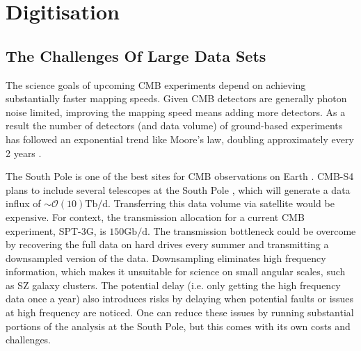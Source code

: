 \documentclass[a4paper,fleqn,usenatbib]{mnras}
\begin{document}






\section{Digitisation}
\label{sec:dig}

\subsection{The Challenges Of Large Data Sets}
\label{subsec:problem}


The science goals of upcoming CMB experiments depend on achieving substantially faster mapping speeds. Given CMB detectors are generally photon noise limited, improving the mapping speed means adding more detectors. As a result the number of detectors (and data volume) of ground-based experiments has followed an exponential trend like Moore's law, doubling approximately every 2 years \citep{s4sciencebook, Abazajian2015}.

The South Pole is one of the best sites for CMB observations on Earth \citep{chamberlin2001, spt2004}. CMB-S4 plans to include several telescopes at the South Pole \citep{s4sciencebook, barron2018}, which will generate a data influx of $\sim\mathcal{O}(10)\mathrm{Tb/d}$. Transferring this data volume via satellite would be expensive. For context, the transmission allocation for a current CMB experiment, SPT-3G, is $150\mathrm{Gb/d}$. The transmission bottleneck could be overcome by recovering the full data on hard drives every summer and transmitting a downsampled version of the data. Downsampling eliminates high frequency information, which makes it unsuitable for science on small angular scales, such as SZ galaxy clusters. The potential delay (i.e. only getting the high frequency data once a year) also introduces risks by delaying when potential faults or issues at high frequency are noticed. One can reduce these issues by running substantial portions of the analysis at the South Pole, but this comes with its own costs and challenges.
\end{document}
